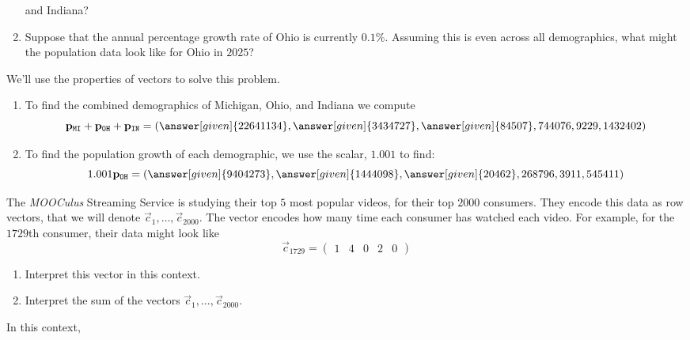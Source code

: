 \documentclass{ximera}
\begin{document}
\begin{example}
\begin{enumerate}
  and Indiana?
\item Suppose that the annual percentage growth rate of Ohio is
  currently $0.1\%$. Assuming this is even across all demographics,
  what might the population data look like for Ohio in $2025$?
\end{enumerate}
\begin{explanation}
  We'll use the properties of vectors to solve this problem.
  \begin{enumerate}
  \item To find the combined demographics of Michigan, Ohio, and
    Indiana we compute
    \[
    \vec{p}_{\texttt{MI}} + \vec{p}_{\texttt{OH}} + \vec{p}_{\texttt{IN}} = \left(\answer[given]{22641134},\answer[given]{3434727},\answer[given]{84507},744076,9229,1432402\right)
    \]
  \item To find the population growth of each demographic, we use the scalar, $1.001$ to find:
    \[
    1.001 \vec{p}_{\texttt{OH}} =\left(\answer[given]{9404273},\answer[given]{1444098},\answer[given]{20462},268796,3911,545411 \right)
    \]
  \end{enumerate}
\end{explanation}
\end{example}


\begin{example}
  The \textit{MOOCulus} Streaming Service is studying their top $5$
  most popular videos, for their top $2000$ consumers. They encode
  this data as row vectors, that we will denote $\vec c_1, \dots,
  \vec c_{2000}$. The vector encodes how many time each consumer has
  watched each video. For example, for the $1729$th consumer, their
  data might look like
  \[
  \vec c_{1729} = \begin{pmatrix} 1 & 4 & 0 &  2 & 0 \end{pmatrix}
  \]
  \begin{enumerate}
  \item Interpret this vector in this context.
  \item Interpret the sum of the vectors $\vec{c}_1, \dots,
    \vec{c}_{2000}$.
  \end{enumerate}
  \begin{explanation}
    In this context, 
  \end{explanation}
\end{example}
\end{document}

